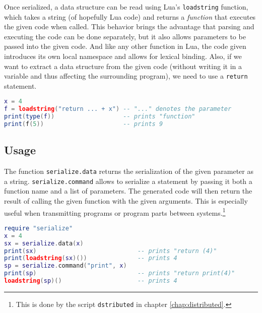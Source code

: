 Once serialized, a data structure can be read using Lua's \texttt{loadstring} function, which takes a string (of hopefully Lua code) and returns a \emph{function} that executes the given code when called. This behavior brings the advantage that parsing and executing the code can be done separately, but it also allows parameters to be passed into the given code. And like any other function in Lua, the code given introduces its own local namespace and allows for lexical binding. Also, if we want to extract a data structure from the given code (without writing it in a variable and thus affecting the surrounding program), we need to use a \texttt{return} statement.

\begin{lstlisting}[language=lua, caption={Using Lua's \texttt{loadstring} function}, label=lst:loadstring, name=lst:loadstring]
x = 4
f = loadstring("return ... + x") -- "..." denotes the parameter
print(type(f))                   -- prints "function"
print(f(5))                      -- prints 9
\end{lstlisting}

\subsection{Usage}
\begin{comment}
TODO: Adjust actual function serialize.command to accept lists of parameters
\end{comment}

The function \texttt{serialize.data} returns the serialization of the given parameter as a string. \texttt{serialize.command} allows to serialize a statement by passing it both a function name and a list of parameters. The generated code will then return the result of calling the given function with the given arguments. This is especially useful when transmitting programs or program parts between systems.\footnote{This is done by the script \texttt{dstributed} in chapter \ref{chap:distributed}.}

\begin{lstlisting}[language=lua, caption={Using \texttt{serialize.data} and \texttt{serialize.command}}, label=lst:serializedatacommand, name=lst:serializedatacommand]
require "serialize"
x = 4
sx = serialize.data(x)
print(sx)                            -- prints "return (4)"
print(loadstring(sx)())              -- prints 4
sp = serialize.command("print", x)
print(sp)                            -- prints "return print(4)"
loadstring(sp)()                     -- prints 4
\end{lstlisting}

